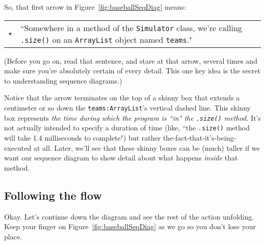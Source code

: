 So, that first arrow in Figure~\ref{fig:baseballSeqDiag} means:

\begin{center}
\begin{tabular}{m{.1in} m{4in}}
\huge $\star$ & \large ``Somewhere in a method of the \texttt{Simulator} class, we're calling
\texttt{.size()} on an \texttt{ArrayList} object named \texttt{teams}."
\end{tabular}
\end{center}

(Before you go on, read that sentence, and stare at that arrow, several times
and make sure you're absolutely certain of every detail. This one key idea is
the secret to understanding sequence diagrams.)

Notice that the arrow terminates on the top of a skinny box that extends a
centimeter or so down the \texttt{teams:ArrayList}'s vertical dashed line.
This skinny box represents \textit{the time during which the program is ``in"
the \texttt{.size()} method.} It's not actually intended to specify a duration
of time (like, ``the \texttt{.size()} method will take 1.4 milliseconds to
complete") but rather the-fact-that-it's-being-executed at all. Later, we'll
see that these skinny boxes can be (much) taller if we want our sequence
diagram to show detail about what happens \textit{inside} that method.

\subsection{Following the flow}

Okay. Let's continue down the diagram and see the rest of the action
unfolding. Keep your finger on Figure~\ref{fig:baseballSeqDiag} as we go so
you don't lose your place.

